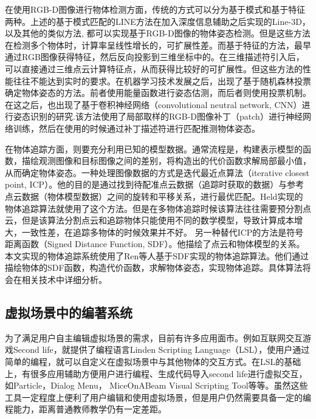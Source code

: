 在使用RGB-D图像进行物体检测方面，传统的方式可以分为基于模式和基于特征两种。上述的基于模式匹配的LINE方法\cite{hinterstoisser2011gradient}在加入深度信息辅助之后实现的Line-3D，以及其他的类似方法\cite{kehl2016hashmod, rios2013discriminatively}, 都可以实现基于RGB-D图像的物体姿态检测。但是这些方法在检测多个物体时，计算率呈线性增长的，可扩展性差。而基于特征的方法，最早通过RGB图像获得特征\cite{lowe2004distinctive}，然后反向投影到三维坐标中的\cite{lowe2001local}。在三维描述符引入后，可以直接通过三维点云计算特征点\cite{mian2010repeatability}，从而获得比较好的可扩展性。但这些方法的性能往往不能达到实时的要求。在机器学习技术发展之后，出现了基于随机森林投票确定物体姿态的方法。\cite{brachmann2016uncertainty, tejani2014latent}前者使用能量函数进行姿态估测，而后者则使用投票机制。在这之后，也出现了基于卷积神经网络（convolutional neutral network, CNN）进行姿态识别的研究\cite{kehl2016deep}.该方法使用了局部取样的RGB-D图像补丁（patch）进行神经网络训练，然后在使用的时候通过补丁描述符进行匹配推测物体姿态。

在物体追踪方面，则要充分利用已知的模型数据。通常流程是，构建表示模型的函数，描绘观测图像和目标图像之间的差别，将构造出的代价函数求解局部最小值，从而确定物体姿态。一种处理图像数据的方式是迭代最近点算法（iterative closest point, ICP）。他的目的是通过找到待配准点云数据（追踪时获取的数据）与参考点云数据（物体模型数据）之间的旋转和平移关系，进行最优匹配。Held实现的物体追踪算法就使用了这个方法。\cite{held20123d}但是在多物体追踪时候该算法往往需要预分割点云，但是该算法分割点云和追踪物体只能使用不同的数学模型，导致计算成本增大，一致性差，在追踪多物体的时候效果并不好。
另一种替代ICP的方法是符号距离函数（Signed Distance Function, SDF）。他描绘了点云和物体模型的关系。本文实现的物体追踪系统使用了Ren等人基于SDF实现的物体追踪算法。\cite{ren2017real}他们通过描绘物体的SDF函数，构造代价函数，求解物体姿态，实现物体追踪。具体算法将会在相关技术中详细分析。

\subsection{虚拟场景中的编著系统}
为了满足用户自主编辑虚拟场景的需求，目前有许多应用面市。例如互联网交互游戏Second life，就提供了编程语言Linden Scripting Language（LSL），使用户通过简单的编程，就可以自定义在虚拟场景中与其他物体的交互方式。\cite{LSLTutorial}在LSL的基础上，有很多应用辅助方便用户进行编程、生成代码导入second life进行虚拟交互，如Particle，Dialog Menu， MiceOnABeam Visual Scripting Tool等等。\cite{zhong2014domain}虽然这些工具一定程度上便利了用户编辑和使用虚拟场景，但是用户仍然需要具备一定的编程能力，距离普通教师教学仍有一定差距。

